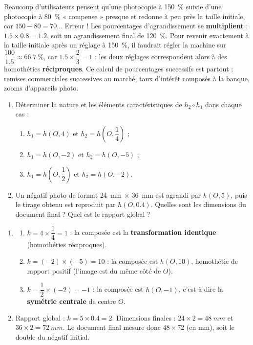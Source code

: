 \documentclass[11pt]{article}
\begin{document}
\begin{savaistu}
Beaucoup d'utilisateurs pensent qu'une photocopie à \SI{150}{\percent} suivie d'une photocopie à \SI{80}{\percent} « compense » presque et redonne à peu près la taille initiale, car $150 - 80 = 70$... Erreur ! Les pourcentages d'agrandissement se \textbf{multiplient} : $\num{1,5} \times \num{0,8} = \num{1,2}$, soit un agrandissement final de \SI{120}{\percent}. Pour revenir exactement à la taille initiale après un réglage à \SI{150}{\percent}, il faudrait régler la machine sur $\dfrac{100}{\num{1,5}} \approx \SI{66,7}{\percent}$, car $\num{1,5} \times \dfrac{2}{3} = 1$ : les deux réglages correspondent alors à des homothéties \textbf{réciproques}. Ce calcul de pourcentages successifs est partout : remises commerciales successives au marché, taux d'intérêt composés à la banque, zooms d'appareils photo.
\end{savaistu}

\begin{exercice}[À faire]
\begin{enumerate}
\item Déterminer la nature et les éléments caractéristiques de $h_2 \circ h_1$ dans chaque cas :
\begin{enumerate}
\item $h_1 = h(O, 4)$ et $h_2 = h\!\left(O, \dfrac{1}{4}\right)$ ;
\item $h_1 = h(O, -2)$ et $h_2 = h(O, -5)$ ;
\item $h_1 = h\!\left(O, \dfrac{1}{2}\right)$ et $h_2 = h(O, -2)$.
\end{enumerate}
\item Un négatif photo de format \SI{24}{mm} $\times$ \SI{36}{mm} est agrandi par $h(O, 5)$, puis le tirage obtenu est reproduit par $h(O, \num{0,4})$. Quelles sont les dimensions du document final ? Quel est le rapport global ?
\end{enumerate}
\end{exercice}

\begin{corrige}[Exercice]
\begin{enumerate}
\item \begin{enumerate}
\item $k = 4 \times \dfrac{1}{4} = 1$ : la composée est la \textbf{transformation identique} (homothéties réciproques).
\item $k = (-2) \times (-5) = 10$ : la composée est $h(O, 10)$, homothétie de rapport positif (l'image est du même côté de $O$).
\item $k = \dfrac{1}{2} \times (-2) = -1$ : la composée est $h(O,-1)$, c'est-à-dire la \textbf{symétrie centrale} de centre $O$.
\end{enumerate}
\item Rapport global : $k = 5 \times \num{0,4} = 2$. Dimensions finales : $24 \times 2 = \SI{48}{mm}$ et $36 \times 2 = \SI{72}{mm}$. Le document final mesure donc $48 \times 72$ (en mm), soit le double du négatif initial.
\end{enumerate}
\end{corrige}
\end{document}
